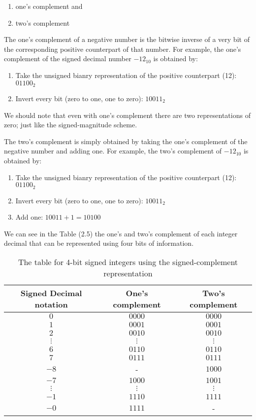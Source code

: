 \begin{enumerate}
    \item one's complement and
    \item two's complement
\end{enumerate}

The one's complement of a negative number is the bitwise
inverse of a very bit of the corresponding positive counterpart
of that number. For example, the one's complement of the signed
decimal number $-12_{10}$ is obtained by:

\begin{enumerate}
    \item Take the unsigned bianry representation of the positive
    counterpart (12): $01100_2$
    \item Invert every bit (zero to one, one to zero): $10011_2$
\end{enumerate}
We should note that even with one's complement there are two
representations of zero; just like the signed-magnitude scheme.

The two's complement is simply obtained by taking the one's
complement of the negative number and adding one. For example,
the two's complement of $-12_{10}$ is obtained by:

\begin{enumerate}
    \item Take the unsigned bianry representation of the positive
    counterpart (12): $01100_2$
    \item Invert every bit (zero to one, one to zero): $10011_2$
    \item Add one: $10011 + 1 = 10100$
\end{enumerate}

We can see in the Table (2.5) the one's and two's complement of each
integer decimal that can be represented using four bits of information.

\begin{table}[ht]
    \centering
    \begin{tabular}{c|c|c}
        Signed Decimal notation & One's complement & Two's complement \\
        \hline
        $0$      & $0000$   & $0000$ \\
        $1$      & $0001$   & $0001$ \\
        $2$      & $0010$   & $0010$ \\
        $\vdots$ & $\vdots$ & $\vdots$ \\
        $6$      & $0110$   & $0110$ \\
        $7$      & $0111$   & $0111$ \\
        $-8$     & -        & $1000$ \\
        $-7$     & $1000$   & $1001$ \\
        $\vdots$ & $\vdots$ & $\vdots$ \\
        $-1$     & $1110$   & $1111$ \\
        $-0$     & $1111$   & - \\
    \end{tabular}
    \caption{The table for 4-bit signed integers using the signed-complement representation}
\end{table}

